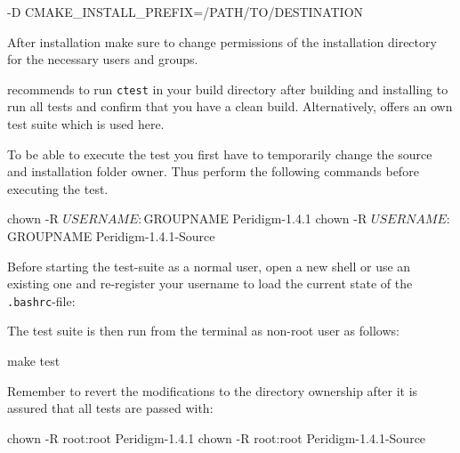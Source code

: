 \begin{code}
-D CMAKE_INSTALL_PREFIX=/PATH/TO/DESTINATION
\end{code}

After installation make sure to change permissions of the installation directory for the necessary users and groups.


\cite{PeridigmUserGuide100} recommends to run \verb+ctest+ in your build directory after building and installing \marktool[\tooladdress]{\toolname} to run all tests and confirm that you have a clean build. Alternatively, \marktool[\tooladdress]{\toolname} offers an own test suite which is used here.

To be able to execute the test you first have to temporarily change the source and installation folder owner. Thus perform the following commands before executing the test.

\begin{code}
chown -R $USERNAME:$GROUPNAME Peridigm-1.4.1
chown -R $USERNAME:$GROUPNAME Peridigm-1.4.1-Source
\end{code}

Before starting the test-suite as a normal user, open a new shell or use an existing one and re-register your username to load the current state of the \verb+.bashrc+-file:


The \marktool[\tooladdress]{\toolname} test suite is then run from the terminal as non-root user as follows:

\begin{code}
make test
\end{code}

Remember to revert the modifications to the \marktool{\toolname} directory ownership after it is assured that all tests are passed with:

\begin{code}
chown -R root:root Peridigm-1.4.1
chown -R root:root Peridigm-1.4.1-Source
\end{code}


